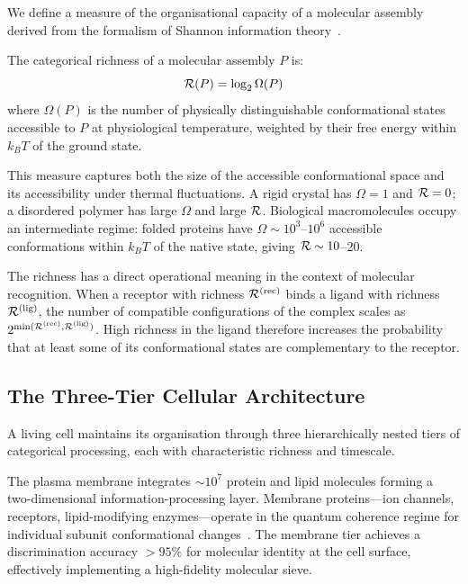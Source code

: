 We define a measure of the organisational capacity of a molecular assembly derived from the formalism of Shannon information theory~\cite{Shannon1948,Cover1991}.

\begin{definition}
\label{v:def:richness}
The categorical richness of a molecular assembly $P$ is:
\begin{equation}
  \mathcal{R}(P) = \log_2 \Omega(P)
  \label{v:eq:richness}
\end{equation}
where $\Omega(P)$ is the number of physically distinguishable conformational states accessible to $P$ at physiological temperature, weighted by their free energy within $k_BT$ of the ground state.
\end{definition}

This measure captures both the size of the accessible conformational space and its accessibility under thermal fluctuations. A rigid crystal has $\Omega = 1$ and $\mathcal{R} = 0$; a disordered polymer has large $\Omega$ and large $\mathcal{R}$. Biological macromolecules occupy an intermediate regime: folded proteins have $\Omega \sim 10^3$--$10^6$ accessible conformations within $k_BT$ of the native state, giving $\mathcal{R} \sim 10$--20.

The richness has a direct operational meaning in the context of molecular recognition. When a receptor with richness $\mathcal{R}^{(\mathrm{rec})}$ binds a ligand with richness $\mathcal{R}^{(\mathrm{lig})}$, the number of compatible configurations of the complex scales as $2^{\min(\mathcal{R}^{(\mathrm{rec})}, \mathcal{R}^{(\mathrm{lig})})}$. High richness in the ligand therefore increases the probability that at least some of its conformational states are complementary to the receptor.

\subsection{The Three-Tier Cellular Architecture}

A living cell maintains its organisation through three hierarchically nested tiers of categorical processing, each with characteristic richness and timescale.

\begin{definition}
\label{v:def:tier1}
The plasma membrane integrates $\sim\!10^7$ protein and lipid molecules forming a two-dimensional information-processing layer. Membrane proteins---ion channels, receptors, lipid-modifying enzymes---operate in the quantum coherence regime for individual subunit conformational changes~\cite{Fleming2011}. The membrane tier achieves a discrimination accuracy $>95\%$ for molecular identity at the cell surface, effectively implementing a high-fidelity molecular sieve.
\end{definition}

